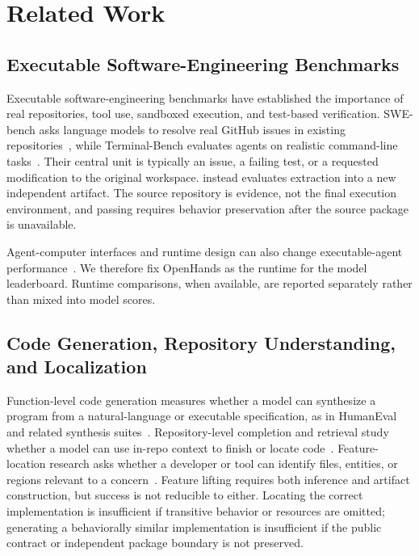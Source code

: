 \section{Related Work}
\label{sec:related-work}

\subsection{Executable Software-Engineering Benchmarks}

Executable software-engineering benchmarks have established the importance of
real repositories, tool use, sandboxed execution, and test-based verification.
SWE-bench asks language models to resolve real GitHub issues in existing
repositories~\cite{jimenez2024swebench}, while Terminal-Bench evaluates agents
on realistic command-line tasks~\cite{merrill2026terminalbench}. Their central
unit is typically an issue, a failing test, or a requested modification to the
original workspace. \flb instead evaluates extraction into a new independent
artifact. The source repository is evidence, not the final execution
environment, and passing requires behavior preservation after the source
package is unavailable.

Agent-computer interfaces and runtime design can also change executable-agent
performance~\cite{yang2024sweagent,yao2026harnessbench}. We therefore fix
OpenHands as the \mainprotocol runtime for the model leaderboard. Runtime
comparisons, when available, are reported separately rather than mixed into
model scores.

\subsection{Code Generation, Repository Understanding, and Localization}

Function-level code generation measures whether a model can synthesize a
program from a natural-language or executable specification, as in HumanEval
and related synthesis
suites~\cite{chen2021codex,austin2021mbpp,lai2023ds1000,zhuo2024bigcodebench,jain2024livecodebench}.
Repository-level completion and retrieval study whether a model can use
in-repo context to finish or locate code~\cite{zhang2023repocoder,liu2024repobench}.
Feature-location research asks whether a developer or tool can identify files,
entities, or regions relevant to a concern~\cite{dit2013featurelocation}.
Feature lifting requires both inference and artifact construction, but success
is not reducible to either. Locating the correct implementation is insufficient
if transitive behavior or resources are omitted; generating a behaviorally
similar implementation is insufficient if the public contract or independent
package boundary is not preserved.

